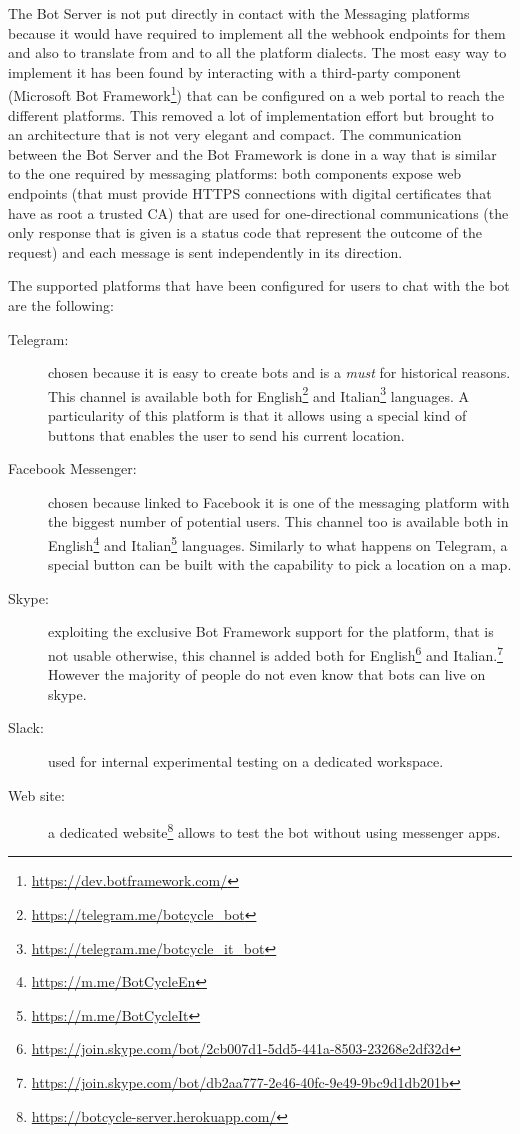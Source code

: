 The Bot Server is not put directly in contact with the Messaging platforms because it would have required to implement all the webhook endpoints for them and also to translate from and to all the platform dialects. The most easy way to implement it has been found by interacting with a third-party component (Microsoft Bot Framework\footnote{\url{https://dev.botframework.com/}}) that can be configured on a web portal to reach the different platforms. This removed a lot of implementation effort but brought to an architecture that is not very elegant and compact. The communication between the Bot Server and the Bot Framework is done in a way that is similar to the one required by messaging platforms: both components expose web endpoints (that must provide HTTPS connections with digital certificates that have as root a trusted CA) that are used for one-directional communications (the only response that is given is a status code that represent the outcome of the request) and each message is sent independently in its direction.

The supported platforms that have been configured for users to chat with the bot are the following:

\begin{description}
	\item[Telegram:] chosen because it is easy to create bots and is a \textit{must} for historical reasons. This channel is available both for English\footnote{\url{https://telegram.me/botcycle\_bot}} and Italian\footnote{\url{https://telegram.me/botcycle\_it\_bot}} languages. A particularity of this platform is that it allows using a special kind of buttons that enables the user to send his current location.
	\item[Facebook Messenger:] chosen because linked to Facebook it is one of the messaging platform with the biggest number of potential users. This channel too is available both in English\footnote{\url{https://m.me/BotCycleEn}} and Italian\footnote{\url{https://m.me/BotCycleIt}} languages. Similarly to what happens on Telegram, a special button can be built with the capability to pick a location on a map.
	\item[Skype:] exploiting the exclusive Bot Framework support for the platform, that is not usable otherwise, this channel is added both for English\footnote{\url{https://join.skype.com/bot/2cb007d1-5dd5-441a-8503-23268e2df32d}} and Italian.\footnote{\url{https://join.skype.com/bot/db2aa777-2e46-40fc-9e49-9bc9d1db201b}} However the majority of people do not even know that bots can live on skype.
	\item[Slack:] used for internal experimental testing on a dedicated workspace.
	\item[Web site:] a dedicated website\footnote{\url{https://botcycle-server.herokuapp.com/}} allows to test the bot without using messenger apps.
\end{description}

